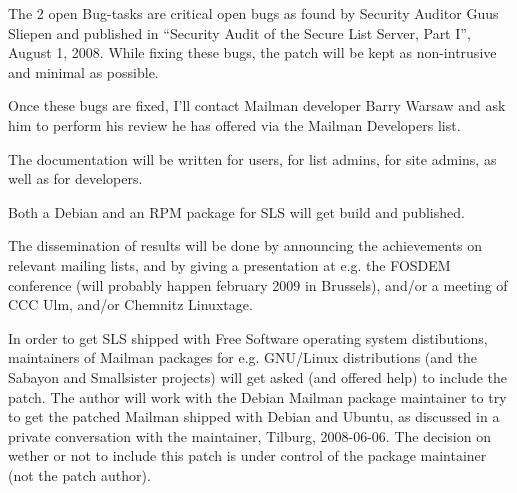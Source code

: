 \documentclass[a4]{article}
\begin{document}
The 2 open Bug-tasks are critical open bugs as found by Security Auditor
Guus Sliepen and published in ``Security Audit of the Secure List Server, Part
I'', August 1, 2008.  While fixing these bugs, the patch will be kept as
non-intrusive and minimal as possible.

Once these bugs are fixed, I'll contact Mailman developer Barry Warsaw and ask
him to perform his review he has offered via the Mailman Developers list.

The documentation will be written for users, for list admins, for site admins,
as well as for developers.

Both a Debian and an RPM package for SLS will get build and published.

The dissemination of results will be done by announcing the achievements on
relevant mailing lists, and by giving a presentation at e.g. the FOSDEM
conference (will probably happen february 2009 in Brussels), and/or
a meeting of CCC Ulm, and/or Chemnitz Linuxtage.

In order to get SLS shipped with Free Software operating system distibutions,
maintainers of Mailman packages for e.g. GNU/Linux distributions (and the
Sabayon and Smallsister projects) will get asked (and offered help) to include
the patch.  The author will work with the Debian Mailman package maintainer to
try to get the patched Mailman shipped with Debian and Ubuntu, as discussed in
a private conversation with the maintainer, Tilburg, 2008-06-06.  The decision
on wether or not to include this patch is under control of the package
maintainer (not the patch author).
\end{document}
